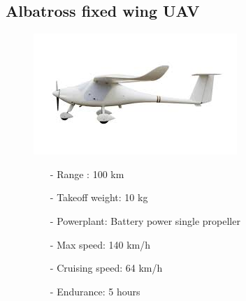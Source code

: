\documentclass{article}
\begin{document}
\subsection{Albatross fixed wing UAV}
\begin{figure}[h]
    \begin{minipage}[b]{.45\linewidth}
        \centering
        \includegraphics[width=0.7\linewidth]{Aircraft pics/Albatross Fixed wing UAV.png}
    \end{minipage}\hfill
    \begin{minipage}[b]{0.45\linewidth}
        \begin{itemize}
            \item [-] Range : 100 km
            \item [-] Takeoff weight: 10 kg
            \item [-] Powerplant: Battery power single propeller
            \item [-] Max speed: 140 km/h 
            \item [-] Cruising speed: 64 km/h 
            \item [-] Endurance: 5 hours
        \end{itemize}
    \end{minipage}
\end{figure}

\vspace{\fill}
\clearpage
\end{document}
